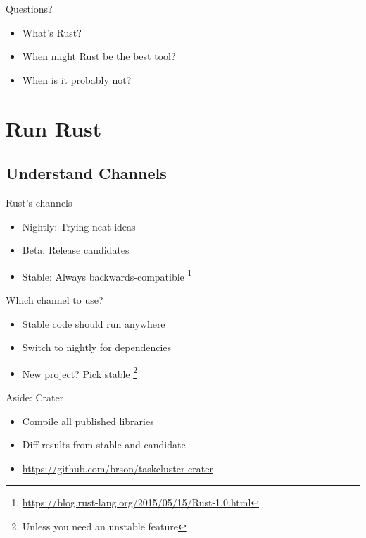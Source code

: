 \documentclass[50pt]{beamer}
\begin{document}
\begin{frame}
    Questions?
    \begin{itemize}
        \item What's Rust?
        \item When might Rust be the best tool?
        \item When is it probably not?
    \end{itemize}
\end{frame}

\section{Run Rust}

\subsection{Understand Channels}

\begin{frame}
    Rust's channels
    \begin{itemize}
        \item Nightly: Trying neat ideas
        \item Beta: Release candidates
        \item Stable: Always backwards-compatible \footnote{\url{https://blog.rust-lang.org/2015/05/15/Rust-1.0.html}}
    \end{itemize}
\end{frame}

\begin{frame}
    Which channel to use?
    \begin{itemize}
        \item Stable code should run anywhere
        \item Switch to nightly for dependencies
        \item New project? Pick stable \footnote{Unless you need an
              unstable feature}
    \end{itemize}
\end{frame}

\begin{frame}
    Aside: Crater
    \begin{itemize}
        \item Compile all published libraries
        \item Diff results from stable and candidate
        \item \url{https://github.com/brson/taskcluster-crater}
    \end{itemize}
\end{frame}
\end{document}
